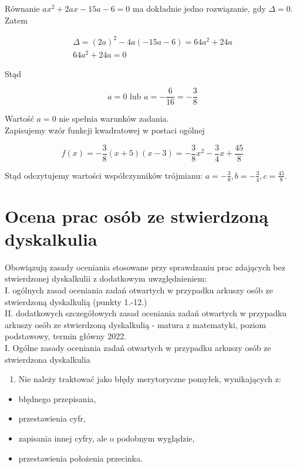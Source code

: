 \documentclass[10pt]{article}
\begin{document}
Równanie $a x^{2}+2 a x-15 a-6=0$ ma dokładnie jedno rozwiązanie, gdy $\Delta=0$. Zatem

$$
\begin{gathered}
\Delta=(2 a)^{2}-4 a(-15 a-6)=64 a^{2}+24 a \\
64 a^{2}+24 a=0
\end{gathered}
$$

Stąd

$$
a=0 \text { lub } a=-\frac{6}{16}=-\frac{3}{8}
$$

Wartość $a=0$ nie spełnia warunków zadania.\\
Zapisujemy wzór funkcji kwadratowej w postaci ogólnej

$$
f(x)=-\frac{3}{8}(x+5)(x-3)=-\frac{3}{8} x^{2}-\frac{3}{4} x+\frac{45}{8}
$$

Stąd odczytujemy wartości współczynników trójmianu: $a=-\frac{3}{8}, b=-\frac{3}{4}, c=\frac{45}{8}$.

\section*{Ocena prac osób ze stwierdzoną dyskalkulia}
Obowiązują zasady oceniania stosowane przy sprawdzaniu prac zdających bez stwierdzonej dyskalkulii z dodatkowym uwzględnieniem:\\
I. ogólnych zasad oceniania zadań otwartych w przypadku arkuszy osób ze stwierdzoną dyskalkulią (punkty 1.-12.)\\
II. dodatkowych szczegółowych zasad oceniania zadań otwartych w przypadku arkuszy osób ze stwierdzoną dyskalkulią - matura z matematyki, poziom podstawowy, termin główny 2022.\\
I. Ogólne zasady oceniania zadań otwartych w przypadku arkuszy osób ze stwierdzona dyskalkulia

\begin{enumerate}
  \item Nie należy traktować jako błędy merytoryczne pomyłek, wynikających z:
\end{enumerate}

\begin{itemize}
  \item błędnego przepisania,
  \item przestawienia cyfr,
  \item zapisania innej cyfry, ale o podobnym wyglądzie,
  \item przestawienia położenia przecinka.
\end{itemize}
\end{document}
